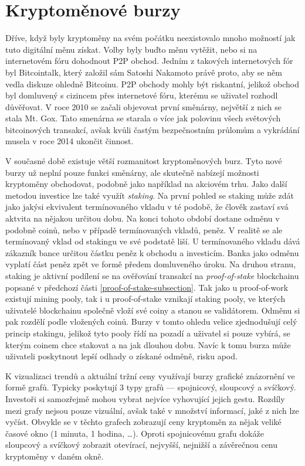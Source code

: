 

\section{Kryptoměnové burzy}
\label{sec:Exchanges}
Dříve, když byly kryptoměny na svém počátku neexistovalo mnoho možností jak tuto digitální měnu získat. Volby byly buďto měnu vytěžit, nebo
si na internetovém fóru dohodnout P2P obchod. Jedním z takových internetových fór byl Bitcointalk, který založil sám Satoshi Nakamoto právě proto,
aby se něm vedla diskuze ohledně Bitcoinu. P2P obchody mohly být riskantní, jelikož obchod byl domluvený s cizincem přes internetové fóru, kterému
se uživatel rozhodl důvěřovat. V roce 2010 se začali objevovat první směnárny, největší z nich se stala Mt. Gox. Tato smenárna se starala o více jak polovinu
všech světových bitcoinových transakcí, avšak kvůli častým bezpečnostním průlomům a vykrádání musela v roce 2014 ukončit činnost.

V současné době existuje větší rozmanitost kryptoměnových burz. Tyto nové burzy už neplní pouze funkci směnárny, ale skutečně nabízejí možnosti
kryptoměny obchodovat, podobně jako například na akciovém trhu. Jako další metodou investice lze také využít \emph{staking}. Na první pohled se staking
může zdát jako jakýsi ekvivalent termínovaného vkladu v té podobě, že člověk zastaví svá aktvita na nějakou určitou dobu. Na konci tohoto období dostane
odměnu v podobně coinů, nebo v případě termínovaných vkladů, peněz. V realitě se ale termínovaný vklad od stakingu ve své podstatě liší. U termínovaného
vkladu dává zákazník bance určitou částku peněz k obchodu a investicím. Banka jako odměnu vyplatí část peněz zpět ve formě předem domluveného úroku.
Na druhou stranu, staking je aktivní podílení se na ověřování transakcí na \emph{proof-of-stake} blockchainu popsané v předchozí části
\ref{proof-of-stake-subsection}. Tak jako u proof-of-work existují mining pooly, tak i u proof-of-stake vznikají staking pooly, ve kterých uživatelé
blockchainu společně vloží své coiny a stanou se validátorem. Odměnu si pak rozdělí podle vložených coinů. Burzy v tomto ohledu velice zjednodušují
celý princip stakingu, jelikož tyto pooly řídí na pozadí a uživatel si pouze vybírá, se kterým coinem chce stakovat a na jak dlouhou dobu. Navíc k tomu
burza může uživateli poskytnout lepší odhady o získané odměně, risku apod.

K vizualizaci trendů a aktuální tržní ceny využívají burzy grafické znázornění ve formě grafů. Typicky poskytují 3 typy grafů --- spojnicový, sloupcový a svíčkový.
Investoři si samozřejmě mohou vybrat nejvíce vyhovující jejich gestu. Rozdíly mezi grafy nejsou pouze vizuální, avšak také v množství informací, jaké z nich lze vyčíst.
Obvykle se v těchto grafech zobrazují ceny kryptoměn za nějak veliké časové okno (1 minuta, 1 hodina, \ldots). Oproti spojnicovému grafu dokáže sloupcový a svíčkový
zobrazit otevírací, nejvyšší, nejnižší a závěrečnou cenu kryptoměny v daném okně.


